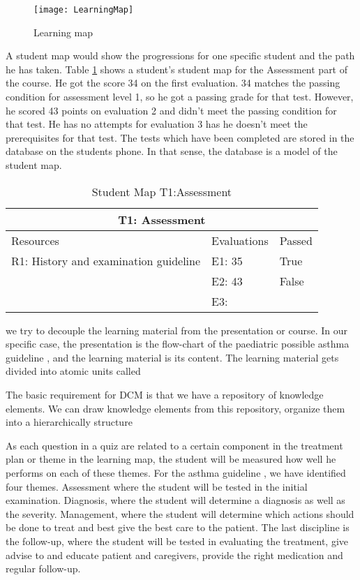 \begin{figure}[h!]
	\caption {Learning map}
	\label{fig:LearningMap}
	\texttt{[image: LearningMap]}
\end{figure}

A student map would show the progressions for one specific student and the path he has taken. Table \ref{table:StudentMap} shows a student's student map for the Assessment part of the course. He got the score 34 on the first evaluation. 34 matches the passing condition for assessment level 1, so he got a passing grade for that test. However, he scored 43 points on evaluation 2 and didn't meet the passing condition for that test. He has no attempts for evaluation 3 has he doesn't meet the prerequisites for that test.  The tests which have been completed are stored in the database on the students phone. In that sense, the database is a model of the student map.

\begin{table}[h!]
	\caption{Student Map T1:Assessment}
	\label{table:StudentMap}
	\begin{tabular}{ | m{16em} | m{10em}| m{6em} | } 
		\hline
		\multicolumn{3}{c}{\bfseries T1: Assessment} \\
		\hline
		Resources & Evaluations & Passed \\
		\hline
		R1: History and examination guideline & E1: 35 & True \\
		& E2: 43 & False \\
		& E3: &  \\
		\hline
	\end{tabular}
\end{table}

 we try to decouple the learning material from the presentation or course. In our specific case, the presentation is the flow-chart of the paediatric possible asthma guideline \parencite{RepublicofKeny2016}, and the learning material is its content. The learning material gets divided into atomic units called 

The basic requirement for DCM is that we have a repository of knowledge elements. We can draw knowledge elements from this repository, organize them into a hierarchically structure 


As each question in a quiz are related to a certain component in the treatment plan or theme in the learning map, the student will be measured how well he performs on each of these themes. For the asthma guideline \parencite{RepublicofKeny2016}, we have identified four themes. Assessment where the student will be tested in the initial examination. Diagnosis, where the student will determine a diagnosis as well as the severity. Management, where the student will determine which actions should be done to treat and best give the best care to the patient. The last discipline is the follow-up, where the student will be tested in evaluating the treatment, give advise to and educate patient and caregivers, provide the right medication and regular follow-up.

